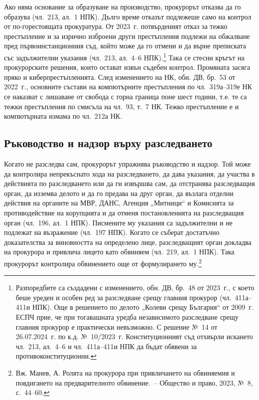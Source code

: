 Ако няма основание за образуване на производство, прокурорът отказва да го образува
(чл.~213, ал.~1 НПК). Дълго време отказът подлежеше само на контрол от по-горестоящата
прокуратура. От 2023~г. потвърденият отказ за тежко престъпление и за изрично изброени
други престъпления подлежи на обжалване пред първоинстанционния съд, който може да го
отмени и да върне преписката със задължителни указания (чл.~213, ал.~4--6
НПК).\footnote{Разпоредбите са създадени с изменението, обн. ДВ, бр.~48 от 2023~г., с което
беше уреден и особен ред за разследване срещу главния прокурор (чл.~411а--411и НПК). Още в
решението по делото „Колеви срещу България“ от 2009~г. ЕСПЧ прие, че при тогавашната
уредба независимото разследване срещу главния прокурор е практически невъзможно. С решение
№~14 от 26.07.2024~г. по к.д. №~10/2023~г. Конституционният съд отхвърли искането
чл.~213, ал.~4--6 и чл.~411а--411и НПК да бъдат обявени за противоконституционни.} Така се
стесни кръгът на прокурорските решения, които остават извън съдебен контрол. Промяната
засяга пряко и киберпрестъпленията. След изменението на НК, обн. ДВ, бр.~53 от 2022~г.,
основните състави на компютърните престъпления по чл.~319а--319е НК се наказват с
лишаване от свобода с горна граница поне шест години, т.е. те са тежки престъпления по
смисъла на чл.~93, т.~7 НК. Тежко престъпление е и компютърната измама по чл.~212а НК.

\subsection{Ръководство и надзор върху разследването}
\label{sec:rakovodstvo}

Когато не разследва сам, прокурорът упражнява ръководство и надзор. Той може да
контролира непрекъснато хода на разследването, да дава указания, да участва в действията
по разследването или да ги извършва сам, да отстранява разследващия орган, да изземва
делото и да го предава на друг орган, да възлага отделни действия на органите на МВР,
ДАНС, Агенция „Митници“ и Комисията за противодействие на корупцията и да отменя
постановленията на разследващия орган (чл.~196, ал.~1 НПК). Писмените му указания са
задължителни и не подлежат на възражение (чл.~197 НПК). Когато се съберат достатъчно
доказателства за виновността на определено лице, разследващият орган докладва на
прокурора и привлича лицето като обвиняем (чл.~219, ал.~1 НПК). Така прокурорът
контролира обвинението още от формулирането му.\footnote{Вж. Манев, А. Ролята на
прокурора при привличането на обвиняемия и повдигането на предварителното обвинение.~--
Общество и право, 2023, №~8, с.~44--60.}

